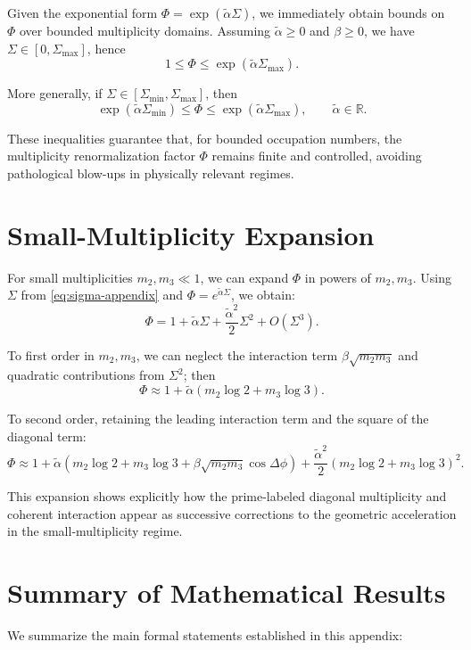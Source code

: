 \documentclass[11pt]{article}
\begin{document}
Given the exponential form \(\Phi = \exp(\tilde\alpha\Sigma)\), we immediately obtain bounds on \(\Phi\) over bounded multiplicity domains. Assuming \(\tilde\alpha\ge 0\) and \(\beta\ge 0\), we have \(\Sigma\in[0,\Sigma_{\max}]\), hence
\[
1 \le \Phi \le \exp(\tilde\alpha \Sigma_{\max}).
\]

More generally, if \(\Sigma\in[\Sigma_{\min},\Sigma_{\max}]\), then
\[
\exp(\tilde\alpha\Sigma_{\min}) \le \Phi \le \exp(\tilde\alpha\Sigma_{\max}),\qquad
\tilde\alpha\in\mathbb{R}.
\]

These inequalities guarantee that, for bounded occupation numbers, the multiplicity renormalization factor \(\Phi\) remains finite and controlled, avoiding pathological blow-ups in physically relevant regimes.

\section{Small-Multiplicity Expansion}

For small multiplicities \(m_2,m_3\ll 1\), we can expand \(\Phi\) in powers of \(m_2,m_3\). Using \(\Sigma\) from \eqref{eq:sigma-appendix} and \(\Phi = e^{\tilde\alpha\Sigma}\), we obtain:
\[
\Phi = 1 + \tilde\alpha\Sigma + \frac{\tilde\alpha^2}{2}\Sigma^2 + O(\Sigma^3).
\]

To first order in \(m_2,m_3\), we can neglect the interaction term \(\beta\sqrt{m_2m_3}\) and quadratic contributions from \(\Sigma^2\); then
\[
\Phi \approx 1 + \tilde\alpha(m_2\log 2 + m_3\log 3).
\]

To second order, retaining the leading interaction term and the square of the diagonal term:
\[
\Phi \approx 1 + \tilde\alpha\left(m_2\log 2 + m_3\log 3 + \beta \sqrt{m_2 m_3}\cos\Delta\phi\right)
+ \frac{\tilde\alpha^2}{2} (m_2\log 2 + m_3\log 3)^2.
\]

This expansion shows explicitly how the prime-labeled diagonal multiplicity and coherent interaction appear as successive corrections to the geometric acceleration in the small-multiplicity regime.

\section{Summary of Mathematical Results}

We summarize the main formal statements established in this appendix:
\end{document}
